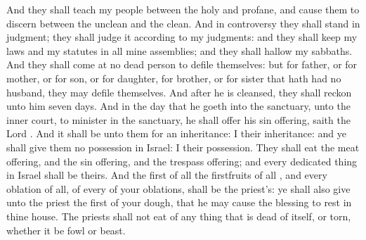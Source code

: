 {And they shall
teach my
people
{} between the
holy and
profane, and cause them to
discern between the
unclean and the
clean.
And in
controversy they shall
stand in
judgment;
{} they shall
judge it according to my
judgments: and they shall
keep my
laws and my
statutes in all mine
assemblies; and they shall
hallow my
sabbaths.
And they shall
come at no
dead
person to
defile themselves: but for
father, or for
mother, or for
son, or for
daughter, for
brother, or for
sister that hath had no
husband, they may
defile themselves.
And
after he is
cleansed, they shall
reckon unto him
seven
days.
And in the
day that he
goeth into the
sanctuary, unto the
inner
court, to
minister in the
sanctuary, he shall
offer his sin
offering,
saith the
Lord
{}.
And it shall be unto them for an
inheritance: I
{} their
inheritance: and ye shall
give them no
possession in
Israel: I
{} their
possession.
They shall
eat the meat
offering, and the sin
offering, and the trespass
offering; and every dedicated
thing in
Israel shall be theirs.
And the
first of all the
firstfruits of all
{}, and every
oblation of all, of every
{} of your
oblations, shall be the
priest’s: ye shall also
give unto the
priest the
first of your
dough, that he may cause the
blessing to
rest in thine
house.
The
priests shall not
eat of any thing that is dead of
itself, or
torn, whether it be
fowl or
beast.

}
